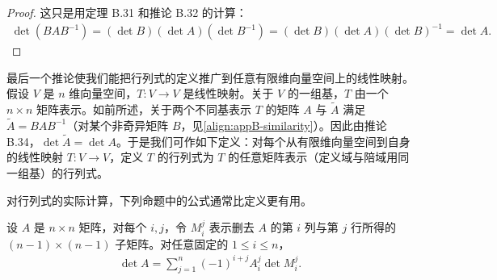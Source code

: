 \documentclass[../../main.tex]{subfiles}
\begin{document}
\begin{proof}
这只是用定理 B.31 和推论 B.32 的计算：
\begin{align*}
\det(BAB^{-1})=(\det B)(\det A)(\det B^{-1})
=(\det B)(\det A)(\det B)^{-1}=\det A.
\end{align*}
\end{proof}

最后一个推论使我们能把行列式的定义推广到任意有限维向量空间上的线性映射。假设 $V$ 是 $n$ 维向量空间，$T:V\to V$ 是线性映射。关于 $V$ 的一组基，$T$ 由一个 $n\times n$ 矩阵表示。如前所述，关于两个不同基表示 $T$ 的矩阵 $A$ 与 $\widetilde A$ 满足 $\widetilde A=BAB^{-1}$（对某个非奇异矩阵 $B$，见\eqref{align:appB-similarity}）。因此由推论 B.34，$\det\widetilde A=\det A$。于是我们可作如下定义：对每个从有限维向量空间到自身的线性映射 $T:V\to V$，定义 $T$ 的行列式为 $T$ 的任意矩阵表示（定义域与陪域用同一组基）的行列式。

对行列式的实际计算，下列命题中的公式通常比定义更有用。

\begin{proposition}[按余子式展开]\label{proposition:appB-minor-expansion}
设 $A$ 是 $n\times n$ 矩阵，对每个 $i,j$，令 $M^j_i$ 表示删去 $A$ 的第 $i$ 列与第 $j$ 行所得的 $(n-1)\times(n-1)$ 子矩阵。对任意固定的 $1\leqslant i\leqslant n$，
\begin{align}\label{align:appB-minor-expansion}
\det A=\sum_{j=1}^n(-1)^{i+j}A^j_i\det M^j_i.
\end{align}
\end{proposition}
\end{document}
